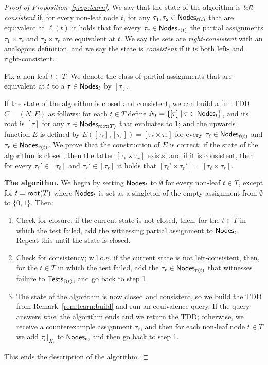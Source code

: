 \begin{toappendix}
\begin{proof}[Proof of Proposition~\ref{prop:learn}]
We say that the state of the algorithm is {\em left-consistent} if, for every non-leaf node $t$, for any $\tau_{1}, \tau_{2}  \in {\sf Nodes}_{\ell(t)}$ that are equivalent at $\ell(t)$ it holds that for every $\tau_r\in {\sf Nodes}_{r(t)}$ the partial assignments $\tau_{1} \times \tau_r$ and $\tau_{2} \times \tau_r$  are equivalent at $t$. 
We say the sets are {\em right-consistent} with an analogous definition, and we say the state is {\em consistent} if it is both left- and right-consistent.

Fix a non-leaf $t\in T$. We denote the class of partial assignments that are equivalent at $t$ to a $\tau\in{\sf Nodes}_t$ by $[\tau]$.

\begin{remark}\label{rem:learn:build}
If the state of the algorithm is closed and consistent, we can build a full TDD $C = (N, E)$ as follows: for each $t\in T$ define $N_t = \{[\tau]\mid \tau\in {\sf Nodes}_t\}$, and its root is $[\tau]$ for any $\tau\in{\sf Nodes}_{{\sf root}(T)}$ that evaluates to 1; and the upwards function $E$ is defined by $E([\tau_\ell], [\tau_r]) = [\tau_\ell \times \tau_r]$ for every $\tau_\ell\in{\sf Nodes}_{\ell(t)}$ and $\tau_r\in{\sf Nodes}_{r(t)}$. 
We prove that the construction of $E$ is correct: if the state of the algorithm is closed, then the latter $[\tau_\ell \times \tau_r]$ exists; and if it is consistent, then for every $\tau_\ell'\in [\tau_\ell]$ and $\tau_r'\in[\tau_r]$ it holds that $[\tau_\ell' \times \tau_r'] = [\tau_\ell \times \tau_r]$.
\end{remark}

{\bf The algorithm. } We begin by setting ${\sf Nodes}_t$ to $\emptyset$ for every non-leaf $t\in T$, except for $t = {\sf root}(T)$ where ${\sf Nodes}_t$ is set as a singleton of the empty assignment from $\emptyset$ to $\{0,1\}$.
Then:
\begin{enumerate}
\item Check for closure; if the current state is not closed, then, for the $t\in T$ in which the test failed, add the witnessing partial assignment to ${\sf Nodes}_t$. Repeat this until the state is closed.
\item Check for consistency; w.l.o.g. if the current state is not left-consistent, then, for the $t\in T$ in which the test failed, add the $\tau_r\in {\sf Nodes}_{r(t)}$ that witnesses failure to ${\sf Tests}_{\ell(t)}$, and go back to step 1.
\item The state of the algorithm is now closed and consistent, so we build the TDD from Remark~\ref{rem:learn:build} and run an equivalence query. If the query answers {\em true}, the algorithm ends and we return the TDD; otherwise, we receive a counterexample assignment $\tau_c$, and then for each non-leaf node $t\in T$ we add $\tau_c\vert_{X_t}$ to ${\sf Nodes}_t$, and then go back to step 1.
\end{enumerate} 
This ends the description of the algorithm.


\end{proof}
\end{toappendix}

